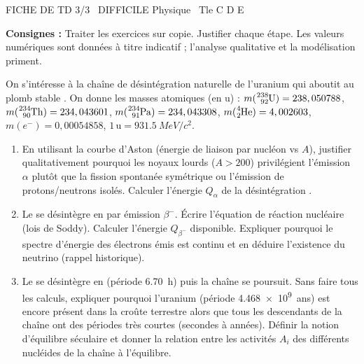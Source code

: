 \documentclass[11pt]{article}
\begin{document}
\begin{tcolorbox}[enhanced,colback=popink,colframe=popink,arc=10pt,boxrule=0pt,left=12pt,right=12pt,top=9pt,bottom=9pt]
{\color{white}\popxbold\small FICHE DE TD 3/3 \textbullet\ DIFFICILE \hfill Physique \textbullet\ Tle C D E\par}
\end{tcolorbox}
\vspace{4pt}
\noindent\textbf{Consignes :} Traiter les exercices sur copie. Justifier chaque étape. Les valeurs numériques sont données à titre indicatif ; l'analyse qualitative et la modélisation priment.

\begin{exercice}
On s'intéresse à la chaîne de désintégration naturelle de l'uranium  qui aboutit au plomb stable . On donne les masses atomiques (en u) : $m(\ce{^{238}_{92}U}) = 238,050788$, $m(\ce{^{234}_{90}Th}) = 234,043601$, $m(\ce{^{234}_{91}Pa}) = 234,043308$, $m(\ce{^{4}_{2}He}) = 4,002603$, $m(e^-) = 0,00054858$, $1\,\text{u} = \SI{931,5}{MeV/c^2}$.
\begin{enumerate}
    \item En utilisant la courbe d'Aston (énergie de liaison par nucléon vs $A$), justifier qualitativement pourquoi les noyaux lourds ($A>200$) privilégient l'émission $\alpha$ plutôt que la fission spontanée symétrique ou l'émission de protons/neutrons isolés. Calculer l'énergie $Q_\alpha$ de la désintégration .
    \item Le  se désintègre en  par émission $\beta^-$. Écrire l'équation de réaction nucléaire (lois de Soddy). Calculer l'énergie $Q_{\beta^-}$ disponible. Expliquer pourquoi le spectre d'énergie des électrons émis est continu et en déduire l'existence du neutrino (rappel historique).
    \item Le  se désintègre en  (période \SI{6,70}{h}) puis la chaîne se poursuit. Sans faire tous les calculs, expliquer pourquoi l'uranium  (période \SI{4,468e9}{ans}) est encore présent dans la croûte terrestre alors que tous les descendants de la chaîne ont des périodes très courtes (secondes à années). Définir la notion d'équilibre séculaire et donner la relation entre les activités $A_i$ des différents nucléides de la chaîne à l'équilibre.
\end{enumerate}
\end{exercice}
\end{document}
